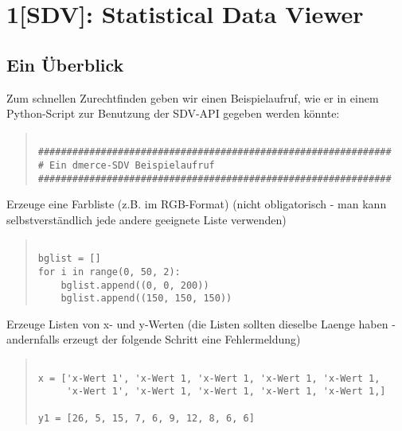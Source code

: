 \chapter{1{[}SDV{]}: Statistical Data Viewer}

\section{Ein \"Uberblick}

Zum schnellen Zurechtfinden geben wir einen Beispielaufruf, wie er in
einem Python-Script zur Benutzung der SDV-API gegeben werden k\"onnte:

\begin{small}
\begin{quote}
\begin{verbatim}

##############################################################
# Ein dmerce-SDV Beispielaufruf
##############################################################

\end{verbatim}
\end{quote}
\end{small}

Erzeuge eine Farbliste (z.B. im RGB-Format) (nicht obligatorisch - man
kann selbstverst\"andlich jede andere geeignete Liste verwenden)

\begin{small}
\begin{quote}
\begin{verbatim}

bglist = []
for i in range(0, 50, 2):
    bglist.append((0, 0, 200))
    bglist.append((150, 150, 150))

\end{verbatim}
\end{quote}
\end{small}

Erzeuge Listen von x- und y-Werten (die Listen sollten dieselbe Laenge
haben - andernfalls erzeugt der folgende Schritt eine Fehlermeldung)

\begin{small}
\begin{quote}
\begin{verbatim}

x = ['x-Wert 1', 'x-Wert 1, 'x-Wert 1, 'x-Wert 1, 'x-Wert 1,
     'x-Wert 1', 'x-Wert 1, 'x-Wert 1, 'x-Wert 1, 'x-Wert 1,]

y1 = [26, 5, 15, 7, 6, 9, 12, 8, 6, 6]

\end{verbatim}
\end{quote}
\end{small}

